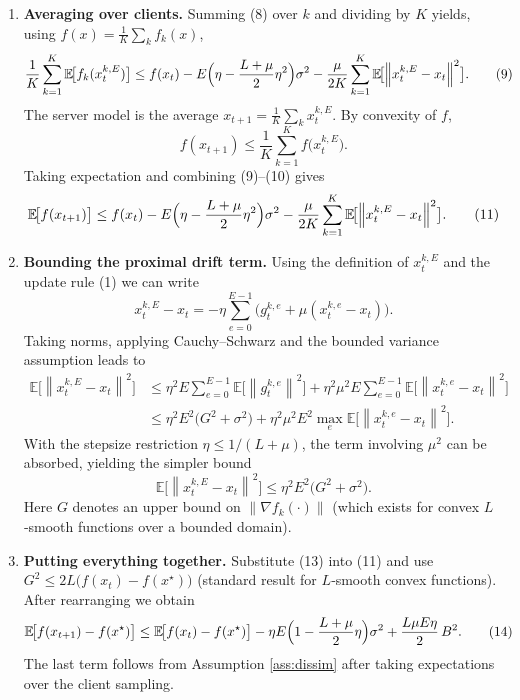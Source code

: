 \documentclass{article}
\newcommand{\E}{\mathbb{E}}
\newcommand{\norm}[1]{\left\lVert #1\right\rVert}
\begin{document}
\begin{enumerate}[label=[Step \arabic*], leftmargin=*]
\item \textbf{Averaging over clients.}  
    Summing (8) over $k$ and dividing by $K$ yields, using $f(x)=\frac{1}{K}\sum_k f_k(x)$,
    \begin{align}
    \frac{1}{K}\sum_{k=1}^{K}\E\!\bigl[f_k(x_{t}^{k,E})\bigr]
    &\le f(x_t)-E\Bigl(\eta-\frac{L+\mu}{2}\eta^2\Bigr)\sigma^2
    -\frac{\mu}{2K}\sum_{k=1}^{K}\E\!\bigl[\norm{x_{t}^{k,E}-x_t}^2\bigr] .
    \tag{9}
    \end{align}
    The server model is the average $x_{t+1}= \frac{1}{K}\sum_k x_{t}^{k,E}$. By convexity of $f$,
    \[
    f(x_{t+1})\le \frac{1}{K}\sum_{k=1}^{K}f\bigl(x_{t}^{k,E}\bigr).
    \tag{10}
    \]
    Taking expectation and combining (9)–(10) gives
    \begin{equation}
    \E\!\bigl[f(x_{t+1})\bigr]
    \le f(x_t)-E\Bigl(\eta-\frac{L+\mu}{2}\eta^2\Bigr)\sigma^2
    -\frac{\mu}{2K}\sum_{k=1}^{K}\E\!\bigl[\norm{x_{t}^{k,E}-x_t}^2\bigr] .
    \tag{11}
    \end{equation}

\item \textbf{Bounding the proximal drift term.}  
    Using the definition of $x_{t}^{k,E}$ and the update rule (1) we can write
    \[
    x_{t}^{k,E}-x_t = -\eta\sum_{e=0}^{E-1}\bigl(g_{t}^{k,e}+\mu(x_{t}^{k,e}-x_t)\bigr) .
    \]
    Taking norms, applying Cauchy–Schwarz and the bounded variance assumption leads to
    \begin{align}
    \E\!\bigl[\norm{x_{t}^{k,E}-x_t}^2\bigr]
    &\le \eta^2E\sum_{e=0}^{E-1}\E\!\bigl[\norm{g_{t}^{k,e}}^2\bigr]
      +\eta^2\mu^2E\sum_{e=0}^{E-1}\E\!\bigl[\norm{x_{t}^{k,e}-x_t}^2\bigr] \nonumber\\
    &\le \eta^2E^2\bigl(G^2+\sigma^2\bigr)
      +\eta^2\mu^2E^2\max_{e}\E\!\bigl[\norm{x_{t}^{k,e}-x_t}^2\bigr] .
    \tag{12}
    \end{align}
    With the stepsize restriction $\eta\le 1/(L+\mu)$, the term involving $\mu^2$ can be absorbed, yielding the simpler bound
    \[
    \E\!\bigl[\norm{x_{t}^{k,E}-x_t}^2\bigr]\le \eta^2E^2\bigl(G^2+\sigma^2\bigr) .
    \tag{13}
    \]
    Here $G$ denotes an upper bound on $\norm{\nabla f_k(\cdot)}$ (which exists for convex $L$‑smooth functions over a bounded domain).

\item \textbf{Putting everything together.}  
    Substitute (13) into (11) and use $G^2\le 2L\bigl(f(x_t)-f(x^\star)\bigr)$ (standard result for $L$‑smooth convex functions). After rearranging we obtain
    \begin{align}
    \E\!\bigl[f(x_{t+1})-f(x^\star)\bigr]
    &\le \E\!\bigl[f(x_t)-f(x^\star)\bigr]
       -\eta E\Bigl(1-\frac{L+\mu}{2}\eta\Bigr)\sigma^2
       +\frac{L\mu E\eta}{2}\,B^2 .
    \tag{14}
    \end{align}
    The last term follows from Assumption \ref{ass:dissim} after taking expectations over the client sampling.


\end{enumerate}
\end{document}
